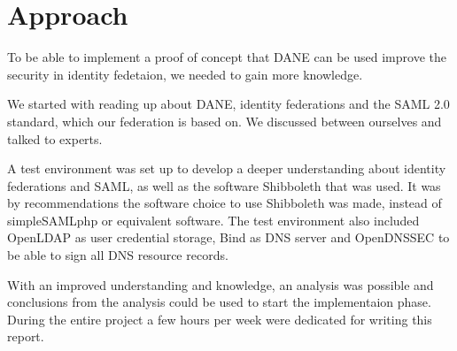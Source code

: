 \section{Approach}

To be able to implement a proof of concept that DANE can be used improve the security in identity fedetaion, 
we needed to gain more knowledge.

We started with reading up about DANE, identity federations and the SAML 2.0 standard, which our federation is based on. 
We discussed between ourselves and talked to experts.

A test environment was set up to develop a deeper understanding about identity federations and SAML, as well as the software 
Shibboleth that was used. 
It was by recommendations the software choice to use Shibboleth was made, instead of simpleSAMLphp or equivalent software.
The test environment also included OpenLDAP as user credential storage, Bind as DNS server and OpenDNSSEC to be able to sign all DNS resource records.

With an improved understanding and knowledge, an analysis was possible and conclusions from the analysis could be used 
to start the implementaion phase. During the entire project a few hours per week were dedicated for writing this report.



 




